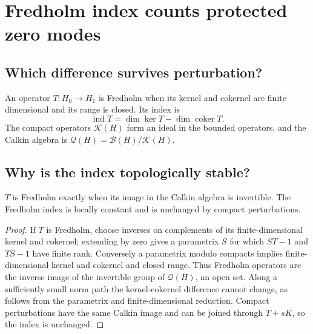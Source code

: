 \chapter{Fredholm index counts protected zero modes}
\label{ch:index}



\section{Which difference survives perturbation?}

An operator $T:H_0\to H_1$ is Fredholm when its kernel and cokernel are finite
dimensional and its range is closed.  Its index is
\[
\operatorname{ind}T=\dim\ker T-\dim\operatorname{coker}T.
\]
The compact operators $\mathcal K(H)$ form an ideal in the bounded operators,
and the Calkin algebra is $\mathcal Q(H)=\mathcal B(H)/\mathcal K(H)$.

\section{Why is the index topologically stable?}

\begin{theorem}
$T$ is Fredholm exactly when its image in the Calkin algebra is invertible.
The Fredholm index is locally constant and is unchanged by compact
perturbations.
\end{theorem}

\begin{proof}
If $T$ is Fredholm, choose inverses on complements of its finite-dimensional
kernel and cokernel; extending by zero gives a parametrix $S$ for which
$ST-1$ and $TS-1$ have finite rank.  Conversely a parametrix modulo compacts
implies finite-dimensional kernel and cokernel and closed range.  Thus
Fredholm operators are the inverse image of the invertible group of
$\mathcal Q(H)$, an open set.  Along a sufficiently small norm path the
kernel-cokernel difference cannot change, as follows from the parametrix and
finite-dimensional reduction.  Compact perturbations have the same Calkin
image and can be joined through $T+sK$, so the index is unchanged.
\end{proof}

